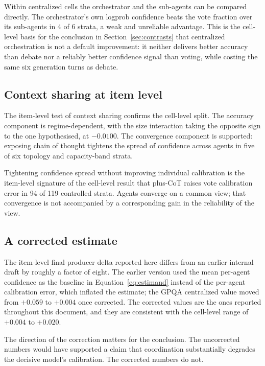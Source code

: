 Within centralized cells the orchestrator and the sub-agents can be compared directly. The
orchestrator's own logprob confidence beats the vote fraction over its sub-agents in 4 of 6
strata, a weak and unreliable advantage. This is the cell-level basis for the conclusion in
Section~\ref{sec:contrasts} that centralized orchestration is not a default improvement: it
neither delivers better accuracy than debate nor a reliably better confidence signal than
voting, while costing the same six generation turns as debate.

\subsection{Context sharing at item level}

The item-level test of context sharing confirms the cell-level split. The accuracy component
is regime-dependent, with the size interaction taking the opposite sign to the one
hypothesised, at $-0.0100$. The convergence component is supported: exposing chain of
thought tightens the spread of confidence across agents in five of six topology and
capacity-band strata.

Tightening confidence spread without improving individual calibration is the item-level
signature of the cell-level result that plus-CoT raises vote calibration error in 94 of 119
controlled strata. Agents converge on a common view; that convergence is not accompanied by
a corresponding gain in the reliability of the view.

\subsection{A corrected estimate}

The item-level final-producer delta reported here differs from an earlier internal draft by
roughly a factor of eight. The earlier version used the mean per-agent confidence as the
baseline in Equation~\ref{eq:estimand} instead of the per-agent calibration error, which
inflated the estimate; the GPQA centralized value moved from $+0.059$ to $+0.004$ once
corrected. The corrected values are the ones reported throughout this document, and they are
consistent with the cell-level range of $+0.004$ to $+0.020$.

The direction of the correction matters for the conclusion. The uncorrected numbers would
have supported a claim that coordination substantially degrades the decisive model's
calibration. The corrected numbers do not.

